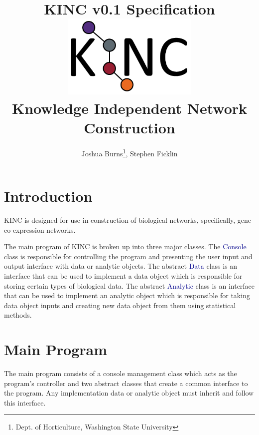 \documentclass[10pt]{article}
\providecommand{\h}[1]{\textcolor{darkblue}{#1}}
\begin{document}
\title{\textbf{KINC v0.1 Specification}\\
\vspace{1mm}
\includegraphics[width=8cm,height=4cm]{KINClogo.png}
\\Knowledge Independent Network Construction}
\author{Joshua Burns\thanks{Dept. of Horticulture, Washington State 
University}, Stephen Ficklin\footnotemark[1]}
\maketitle

\newpage
\tableofcontents

\newpage
\section{Introduction}

KINC is designed for use in construction of biological networks, specifically, 
gene co-expression networks.

The main program of KINC is broken up into three major classes. The \h{Console} 
class is responsible for controlling the program and presenting the user input 
and output interface with data or analytic objects. The abstract \h{Data} class 
is an interface that can be used to implement a data object which is responsible 
for storing certain types of biological data. The abstract \h{Analytic} class is 
an interface that can be used to implement an analytic object which is 
responsible for taking data object inputs and creating new data object from 
them using statistical methods.

\newpage
\section{Main Program}

The main program consists of a console management class which acts as the 
program's controller and two abstract classes that create a common 
interface to the program. Any implementation data or analytic object must 
inherit and follow this interface.
\end{document}
